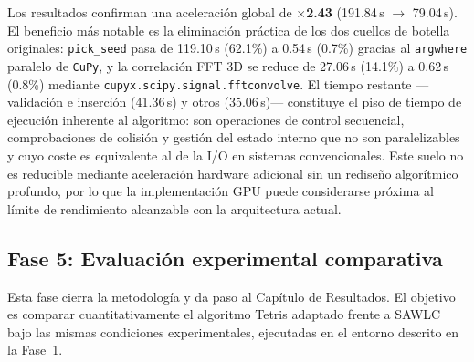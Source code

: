\begin{enumerate}
    Los resultados confirman una aceleración global de $\times$\textbf{2.43} (191.84\,s $\to$ 79.04\,s). El beneficio más notable es la eliminación práctica de los dos cuellos de botella originales: \texttt{pick\_seed} pasa de 119.10\,s (62.1\%) a 0.54\,s (0.7\%) gracias al \texttt{argwhere} paralelo de \texttt{CuPy}, y la correlación FFT 3D se reduce de 27.06\,s (14.1\%) a 0.62\,s (0.8\%) mediante \texttt{cupyx.scipy.signal.fftconvolve}. El tiempo restante —validación e inserción (41.36\,s) y otros (35.06\,s)— constituye el piso de tiempo de ejecución inherente al algoritmo: son operaciones de control secuencial, comprobaciones de colisión y gestión del estado interno que no son paralelizables y cuyo coste es equivalente al de la I/O en sistemas convencionales. Este suelo no es reducible mediante aceleración hardware adicional sin un rediseño algorítmico profundo, por lo que la implementación GPU puede considerarse próxima al límite de rendimiento alcanzable con la arquitectura actual.
\end{enumerate}

\subsection{Fase 5: Evaluación experimental comparativa}

Esta fase cierra la metodología y da paso al Capítulo de Resultados. El objetivo es comparar cuantitativamente el algoritmo Tetris adaptado frente a SAWLC bajo las mismas condiciones experimentales, ejecutadas en el entorno descrito en la Fase~1.

